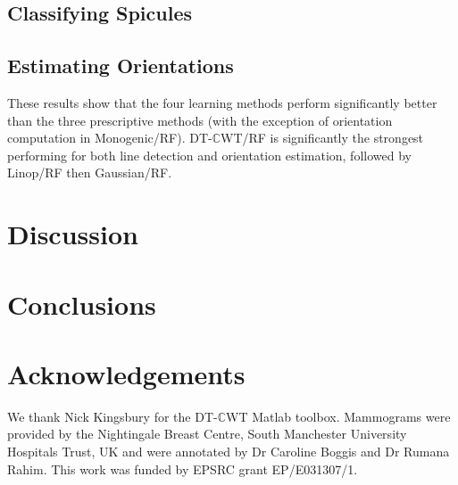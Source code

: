 \documentclass{IEEEtran}
\def\dtcwt{DT-$\mathbb{C}$WT}
\begin{document}
\subsection{Classifying Spicules}


\subsection{Estimating Orientations}


These results show that the four learning methods perform significantly better than the three prescriptive methods (with the exception of orientation computation in Monogenic/RF). \dtcwt{}/RF is significantly the strongest performing for both line detection and orientation estimation, followed by Linop/RF then Gaussian/RF.

%
%

%
%
%


\clearpage
\section{Discussion}



\clearpage
\section{Conclusions}



\section*{Acknowledgements}
We thank Nick Kingsbury for the \dtcwt{} Matlab toolbox. Mammograms were provided by the Nightingale Breast Centre, South Manchester University Hospitals Trust, UK and were annotated by Dr Caroline Boggis and Dr Rumana Rahim. This work was funded by EPSRC grant EP/E031307/1.



\end{document}

